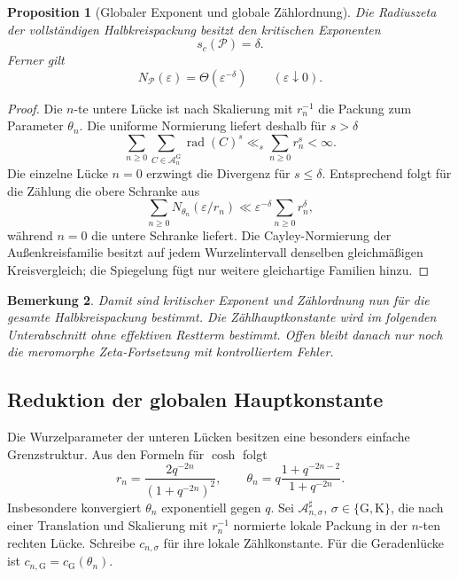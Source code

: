 \documentclass[11pt,a4paper]{article}
\newtheorem{remark}{Bemerkung}[section]
\newtheorem{proposition}[remark]{Proposition}
\begin{document}
\begin{proposition}[Globaler Exponent und globale Zählordnung]
Die Radiuszeta der vollständigen Halbkreispackung besitzt den kritischen
Exponenten
\[
 s_c(\mathcal P)=\delta.
\]
Ferner gilt
\[
 N_{\mathcal P}(\varepsilon)=\Theta(\varepsilon^{-\delta})
 \qquad(\varepsilon\downarrow0).
\]
\end{proposition}

\begin{proof}
Die $n$-te untere Lücke ist nach Skalierung mit $r_n^{-1}$ die Packung zum
Parameter $\theta_n$. Die uniforme Normierung liefert deshalb für $s>\delta$
\[
 \sum_{n\ge0}\sum_{C\in\mathcal A_n^{\mathrm G}}
 \operatorname{rad}(C)^s
 \ll_s\sum_{n\ge0}r_n^s<\infty.
\]
Die einzelne Lücke $n=0$ erzwingt die Divergenz für $s\le\delta$.
Entsprechend folgt für die Zählung die obere Schranke aus
\[
 \sum_{n\ge0}N_{\theta_n}(\varepsilon/r_n)
 \ll \varepsilon^{-\delta}\sum_{n\ge0}r_n^\delta,
\]
während $n=0$ die untere Schranke liefert. Die Cayley-Normierung der
Außenkreisfamilie besitzt auf jedem Wurzelintervall denselben gleichmäßigen
Kreisvergleich; die Spiegelung fügt nur weitere gleichartige Familien hinzu.
\end{proof}

\begin{remark}
Damit sind kritischer Exponent und Zählordnung nun für die gesamte
Halbkreispackung bestimmt. Die Zählhauptkonstante wird im folgenden
Unterabschnitt ohne effektiven Restterm bestimmt. Offen bleibt danach nur
noch die meromorphe Zeta-Fortsetzung mit kontrolliertem Fehler.
\end{remark}

\subsection{Reduktion der globalen Hauptkonstante}

Die Wurzelparameter der unteren Lücken besitzen eine besonders einfache
Grenzstruktur. Aus den Formeln für $\cosh$ folgt
\begin{equation}\label{eq:root-parameter-exact}
 r_n=\frac{2q^{-2n}}{(1+q^{-2n})^2},
 \qquad
 \theta_n
 =q\frac{1+q^{-2n-2}}{1+q^{-2n}}.
\end{equation}
Insbesondere konvergiert $\theta_n$ exponentiell gegen $q$. Sei
$\mathcal A_{n,\sigma}^{\sharp}$, $\sigma\in\{\mathrm G,\mathrm K\}$,
die nach einer Translation und Skalierung mit $r_n^{-1}$ normierte lokale
Packung in der $n$-ten rechten Lücke. Schreibe
$c_{n,\sigma}$ für ihre lokale Zählkonstante. Für die Geradenlücke ist
$c_{n,\mathrm G}=c_{\mathrm G}(\theta_n)$.
\end{document}
